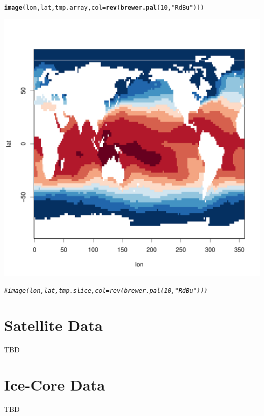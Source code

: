 \documentclass{article}\usepackage[]{graphicx}\usepackage[]{color}
\makeatletter
\def\maxwidth{ %
  \ifdim\Gin@nat@width>\linewidth
    \linewidth
  \else
    \Gin@nat@width
  \fi
}
\newcommand{\hlnum}[1]{\textcolor[rgb]{0.686,0.059,0.569}{#1}}%
\newcommand{\hlstr}[1]{\textcolor[rgb]{0.192,0.494,0.8}{#1}}%
\newcommand{\hlcom}[1]{\textcolor[rgb]{0.678,0.584,0.686}{\textit{#1}}}%
\newcommand{\hlstd}[1]{\textcolor[rgb]{0.345,0.345,0.345}{#1}}%
\newcommand{\hlkwc}[1]{\textcolor[rgb]{0.333,0.667,0.333}{#1}}%
\newcommand{\hlkwd}[1]{\textcolor[rgb]{0.737,0.353,0.396}{\textbf{#1}}}%
\newenvironment{kframe}{%
 \def\at@end@of@kframe{}%
 \ifinner\ifhmode%
  \def\at@end@of@kframe{\end{minipage}}%
  \begin{minipage}{\columnwidth}%
 \fi\fi%
 \def\FrameCommand##1{\hskip\@totalleftmargin \hskip-\fboxsep
 \colorbox{shadecolor}{##1}\hskip-\fboxsep
     \hskip-\linewidth \hskip-\@totalleftmargin \hskip\columnwidth}%
 \MakeFramed {\advance\hsize-\width
   \@totalleftmargin\z@ \linewidth\hsize
   \@setminipage}}%
 {\par\unskip\endMakeFramed%
 \at@end@of@kframe}
\newenvironment{knitrout}{}{} %
\makeatother
\begin{document}
\begin{knitrout}
\begin{kframe}
{\ttfamily\noindent\bfseries\color{errorcolor}{\#\# Error in tmp.array[, , m]: incorrect number of dimensions}}\begin{alltt}
\hlkwd{image}\hlstd{(lon, lat, tmp.array,} \hlkwc{col} \hlstd{=} \hlkwd{rev}\hlstd{(}\hlkwd{brewer.pal}\hlstd{(}\hlnum{10}\hlstd{,} \hlstr{"RdBu"}\hlstd{)))}
\end{alltt}
\end{kframe}
\includegraphics[width=\maxwidth]{figure/unnamed-chunk-2-2} 
\begin{kframe}\begin{alltt}
\hlcom{# image(lon, lat, tmp.slice, col = rev(brewer.pal(10, "RdBu")))}
\end{alltt}
\end{kframe}
\end{knitrout}

\section{Satellite Data}

TBD

\section{Ice-Core Data}

TBD
\end{document}

